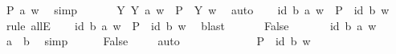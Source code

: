 \begin{isabellebody}
\ {\isachardoublequoteopen}P\ a\ w{\isachardoublequoteclose}\ \isamarkupfalse%
\ simp\isanewline
\ \ \isamarkupfalse%
\ {}\ \isamarkupfalse%
\ {\isachardoublequoteopen}{\isasymforall}Y{\isachardot}\ Y\ a\ w\ {\isasymlongrightarrow}\ {\isacharparenleft}{\isacharparenleft}P\ {\isasymRrightarrow}\ Y{\isacharparenright}\ w{\isacharparenright}{\isachardoublequoteclose}\ \isamarkupfalse%
\ auto\isanewline
\ \ \isamarkupfalse%
\ {\isachardoublequoteopen}{\isacharparenleft}\isactrlbold {\isasymrightharpoondown}{\isacharparenleft}id\ b{\isacharparenright}{\isacharparenright}\ a\ w\ {\isasymlongrightarrow}\ {\isacharparenleft}P\ {\isasymRrightarrow}\ {\isacharparenleft}\isactrlbold {\isasymrightharpoondown}{\isacharparenleft}id\ b{\isacharparenright}{\isacharparenright}{\isacharparenright}\ w{\isachardoublequoteclose}\ \isamarkupfalse%
\ {\isacharparenleft}rule\ allE{\isacharparenright}\isanewline
\ \ \isamarkupfalse%
\ {\isachardoublequoteopen}{\isasymnot}{\isacharparenleft}\isactrlbold {\isasymrightharpoondown}{\isacharparenleft}id\ b{\isacharparenright}{\isacharparenright}\ a\ w\ {\isasymor}\ {\isacharparenleft}{\isacharparenleft}P\ {\isasymRrightarrow}\ {\isacharparenleft}\isactrlbold {\isasymrightharpoondown}{\isacharparenleft}id\ b{\isacharparenright}{\isacharparenright}{\isacharparenright}\ w{\isacharparenright}{\isachardoublequoteclose}\ \isamarkupfalse%
\ blast\ \isanewline
\ \ \isamarkupfalse%
\ \isamarkupfalse%
\ False\ \isamarkupfalse%
\isanewline
\ \ \ \ \isamarkupfalse%
\ {\isachardoublequoteopen}{\isasymnot}{\isacharparenleft}\isactrlbold {\isasymrightharpoondown}{\isacharparenleft}id\ b{\isacharparenright}{\isacharparenright}\ a\ w{\isachardoublequoteclose}\isanewline
\ \ \ \ \isamarkupfalse%
\ {\isachardoublequoteopen}a\ {\isacharequal}\ b{\isachardoublequoteclose}\ \isamarkupfalse%
\ simp\isanewline
\ \ \ \ \isamarkupfalse%
\ False\ \isamarkupfalse%
\ {}\ \isamarkupfalse%
\ auto\isanewline
\ \ \ \ \isamarkupfalse%
\ \ \isanewline
\ \ \ \ \isamarkupfalse%
\ {\isachardoublequoteopen}{\isacharparenleft}{\isacharparenleft}P\ {\isasymRrightarrow}\ {\isacharparenleft}\isactrlbold {\isasymrightharpoondown}{\isacharparenleft}id\ b{\isacharparenright}{\isacharparenright}{\isacharparenright}\ w{\isacharparenright}{\isachardoublequoteclose}\isanewline

\end{isabellebody}
